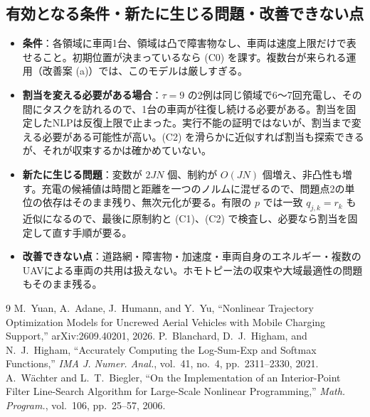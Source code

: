 \documentclass[uplatex,dvipdfmx,a4paper,11pt,jafont=haranoaji]{bxjsarticle}
\newcommand{\answerpart}[1]{\par\Needspace{6\baselineskip}\subsection*{#1}}
\begin{document}
\answerpart{有効となる条件・新たに生じる問題・改善できない点}
\begin{itemize}
  \item \textbf{条件}：各領域に車両1台、領域は凸で障害物なし、車両は速度上限だけで表せること。初期位置が決まっているなら (C0) を課す。複数台が来られる運用（改善案 (a)）では、このモデルは厳しすぎる。
  \item \textbf{割当を変える必要がある場合}：$\tau=9$ の2例は同じ領域で6〜7回充電し、その間にタスクを訪れるので、1台の車両が往復し続ける必要がある。割当を固定したNLPは反復上限で止まった。実行不能の証明ではないが、割当まで変える必要がある可能性が高い。(C2) を滑らかに近似すれば割当も探索できるが、それが収束するかは確かめていない。
  \item \textbf{新たに生じる問題}：変数が $2JN$ 個、制約が $O(JN)$ 個増え、非凸性も増す。充電の候補値は時間と距離を一つのノルムに混ぜるので、問題点2の単位の依存はそのまま残り、無次元化が要る。有限の $p$ では一致 $q_{j,k}=r_k$ も近似になるので、最後に原制約と (C1)、(C2) で検査し、必要なら割当を固定して直す手順が要る。
  \item \textbf{改善できない点}：道路網・障害物・加速度・車両自身のエネルギー・複数のUAVによる車両の共用は扱えない。ホモトピー法の収束や大域最適性の問題もそのまま残る。
\end{itemize}

\FloatBarrier
{\small\renewcommand{\Needspace}[1]{}%
\begin{thebibliography}{9}
 M.~Yuan, A.~Adane, J.~Humann, and Y.~Yu, ``Nonlinear Trajectory Optimization Models for Uncrewed Aerial Vehicles with Mobile Charging Support,'' arXiv:2609.40201, 2026.
 P.~Blanchard, D.~J.~Higham, and N.~J.~Higham, ``Accurately Computing the Log-Sum-Exp and Softmax Functions,'' \textit{IMA J. Numer. Anal.}, vol.~41, no.~4, pp.~2311--2330, 2021.
 A.~W\"achter and L.~T.~Biegler, ``On the Implementation of an Interior-Point Filter Line-Search Algorithm for Large-Scale Nonlinear Programming,'' \textit{Math. Program.}, vol.~106, pp.~25--57, 2006.
\end{thebibliography}}
\end{document}
